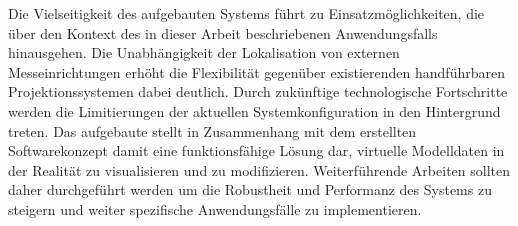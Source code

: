 Die Vielseitigkeit des aufgebauten Systems führt zu Einsatzmöglichkeiten, die über den Kontext des in dieser Arbeit beschriebenen Anwendungsfalls hinausgehen. Die Unabhängigkeit der Lokalisation von externen Messeinrichtungen erhöht die Flexibilität gegenüber existierenden handführbaren Projektionssystemen dabei deutlich. Durch zukünftige technologische Fortschritte werden die Limitierungen der aktuellen Systemkonfiguration in den Hintergrund treten. Das aufgebaute \kps{} stellt in Zusammenhang mit dem erstellten Softwarekonzept damit eine funktionsfähige Lösung dar, virtuelle Modelldaten in der Realität zu visualisieren und zu modifizieren. Weiterführende Arbeiten sollten daher durchgeführt werden um die Robustheit und Performanz des Systems zu steigern und weiter spezifische Anwendungsfälle zu implementieren.




%
%



